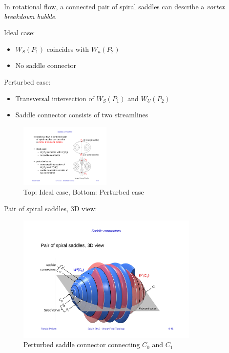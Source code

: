 In rotational flow, a connected pair of spiral saddles can describe a \emph{vortex breakdown bubble}.
\begin{description}
    \item Ideal case:    
        \begin{itemize}
            \item $W_S(P_1)$ coincides with $W_u(P_2)$
            \item No saddle connector
        \end{itemize}
    \item Perturbed case:
        \begin{itemize}
            \item Transversal intersection of $W_S(P_1)$ and $W_U(P_2)$
            \item Saddle connector consists of two streamlines
        \end{itemize}
\end{description}
\begin{figure}[H]
\centering
\includegraphics[width=0.4\textwidth]{img/08_saddle_connectors}
    \caption{Top: Ideal case, Bottom: Perturbed case}
\end{figure}

Pair of spiral saddles, 3D view:
\begin{figure}[H]
\centering
\includegraphics[width=0.8\textwidth]{img/08_pair_spiral_saddles}
\caption{Perturbed saddle connector connecting $C_0$ and $C_1$}
\end{figure}

